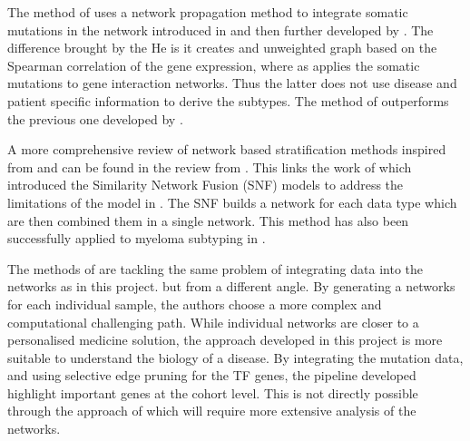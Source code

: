 The method of \citet{He2017-dj} uses a network propagation method to integrate somatic mutations in the network introduced in \citet{Vanunu2010-el} and then further developed by \citet{Hofree2013-ld}. The difference brought by the He is it creates and unweighted graph based on the Spearman correlation of the gene expression, where as \citet{Hofree2013-ld} applies the somatic mutations to gene interaction networks. Thus the latter does not use disease and patient specific information to derive the subtypes. The method of \citet{He2017-dj} outperforms the previous one developed by \citet{Hofree2013-ld}.

A more comprehensive review of network based stratification methods inspired from \citet{Hofree2013-ld} and \citet{He2017-dj} can be found in the review from \citet{Petti2023-qo}. This links the work of \citet{Wang2014-wr} which introduced the Similarity Network Fusion (SNF) models to address the limitations of the model in \citet{Hofree2013-ld}. The SNF builds a network for each data type which are then combined them in a single network. This method has also been successfully applied to myeloma subtyping in \citet{Bhalla2021-uv}.

The methods of \citet{Hofree2013-ld, He2017-dj} are tackling the same problem of integrating data into the networks as in this project. but from a different angle. By generating a networks for each individual sample, the authors choose a more complex and computational challenging path. While individual networks are closer to a personalised medicine solution, the approach developed in this project is more suitable to understand the biology of a disease. By integrating the mutation data, and using selective edge pruning for the TF genes, the pipeline developed highlight important genes at the cohort level. This is not directly possible through the approach of \citet{Hofree2013-ld, He2017-dj} which will require more extensive analysis of the networks.




